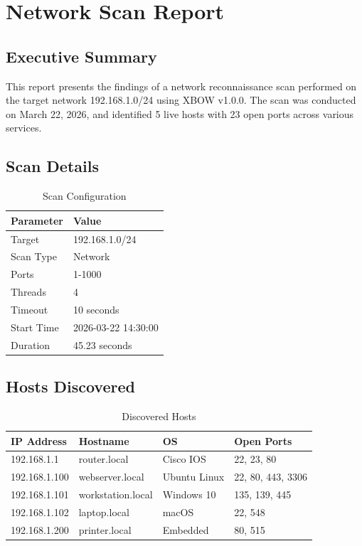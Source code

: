 \documentclass[12pt,a4paper]{report}
\begin{document}
\section{Network Scan Report}

\subsection{Executive Summary}

This report presents the findings of a network reconnaissance scan performed on the target network 192.168.1.0/24 using XBOW v1.0.0. The scan was conducted on March 22, 2026, and identified 5 live hosts with 23 open ports across various services.

\subsection{Scan Details}

\begin{table}[H]
    \centering
    \caption{Scan Configuration}
    \label{tab:scan_config}
    \begin{tabular}{@{}ll@{}}
        \toprule
        Parameter & Value \\
        \midrule
        Target & 192.168.1.0/24 \\
        Scan Type & Network \\
        Ports & 1-1000 \\
        Threads & 4 \\
        Timeout & 10 seconds \\
        Start Time & 2026-03-22 14:30:00 \\
        Duration & 45.23 seconds \\
        \bottomrule
    \end{tabular}
\end{table}

\subsection{Hosts Discovered}

\begin{table}[H]
    \centering
    \caption{Discovered Hosts}
    \label{tab:hosts}
    \begin{tabular}{@{}llll@{}}
        \toprule
        IP Address & Hostname & OS & Open Ports \\
        \midrule
        192.168.1.1 & router.local & Cisco IOS & 22, 23, 80 \\
        192.168.1.100 & webserver.local & Ubuntu Linux & 22, 80, 443, 3306 \\
        192.168.1.101 & workstation.local & Windows 10 & 135, 139, 445 \\
        192.168.1.102 & laptop.local & macOS & 22, 548 \\
        192.168.1.200 & printer.local & Embedded & 80, 515 \\
        \bottomrule
    \end{tabular}
\end{table}
\end{document}
